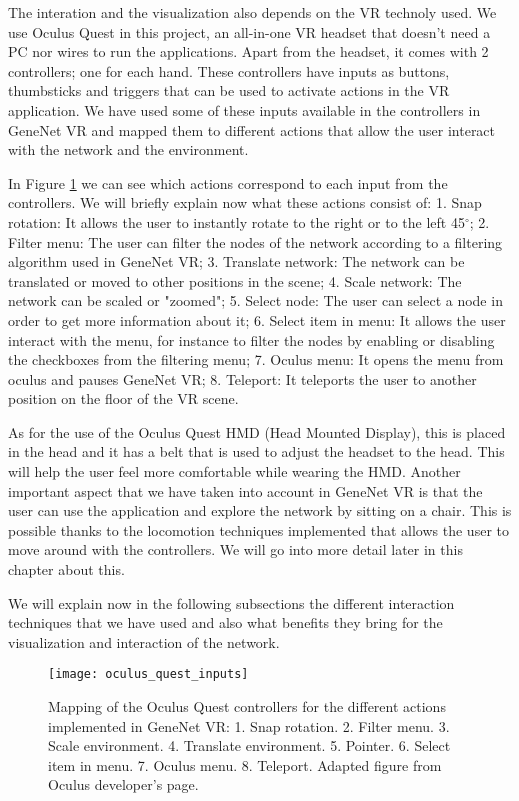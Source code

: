 The interation and the visualization also depends on the VR technoly used. We use Oculus Quest in this project, an all-in-one VR headset that doesn't need a PC nor wires to run the applications. Apart from the headset, it comes with 2 controllers; one for each hand. These controllers have inputs as buttons, thumbsticks and triggers that can be used to activate actions in the VR application. We have used some of these inputs available in the controllers in GeneNet VR and mapped them to different actions that allow the user interact with the network and the environment.

In Figure \ref{fig:oculus_quest_inputs} we can see which actions correspond to each input from the controllers. We will briefly explain now what these actions consist of: 1. Snap rotation: It allows the user to instantly rotate to the right or to the left 45$^{\circ}$; 2. Filter menu: The user can filter the nodes of the network according to a filtering algorithm used in GeneNet VR; 3. Translate network: The network can be translated or moved to other positions in the scene; 4. Scale network: The network can be scaled or "zoomed"; 5. Select node: The user can select a node in order to get more information about it; 6. Select item in menu: It allows the user interact with the menu, for instance to filter the nodes by enabling or disabling the checkboxes from the filtering menu; 7. Oculus menu: It opens the menu from oculus and pauses GeneNet VR; 8. Teleport: It teleports the user to another position on the floor of the VR scene.

As for the use of the Oculus Quest HMD (Head Mounted Display), this is placed in the head and it has a belt that is used to adjust the headset to the head. This will help the user feel more comfortable while wearing the HMD. Another important aspect that we have taken into account in GeneNet VR is that the user can use the application and explore the network by sitting on a chair. This is possible thanks to the locomotion techniques implemented that allows the user to move around with the controllers. We will go into more detail later in this chapter about this.

We will explain now in the following subsections the different interaction techniques that we have used and also what benefits they bring for the visualization and interaction of the network.

\begin{figure}[h!]
    \centering%
    \texttt{[image: oculus\_quest\_inputs]}
    \caption{Mapping of the Oculus Quest controllers for the different actions implemented in GeneNet VR: 1. Snap rotation. 2. Filter menu. 3. Scale environment. 4. Translate environment. 5. Pointer. 6. Select item in menu. 7. Oculus menu. 8. Teleport. Adapted figure from Oculus developer's page\cite{oculus_inputs}.}
    \label{fig:oculus_quest_inputs}
\end{figure}%

